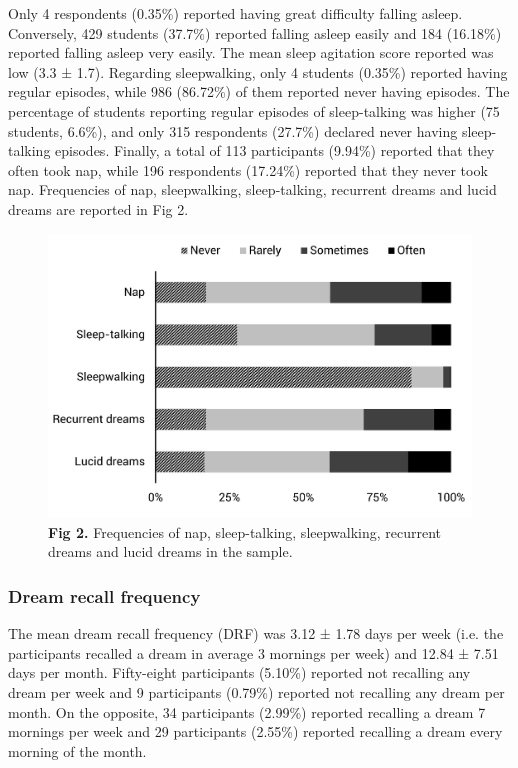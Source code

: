 Only 4 respondents (0.35\%) reported having great difficulty falling asleep. Conversely, 429 students (37.7\%) reported falling asleep easily and 184 (16.18\%) reported falling asleep very easily. The mean sleep agitation score reported was low (3.3 ± 1.7). Regarding sleepwalking, only 4 students (0.35\%) reported having regular episodes, while 986 (86.72\%) of them reported never having episodes. The percentage of students reporting regular episodes of sleep-talking was higher (75 students, 6.6\%), and only 315 respondents (27.7\%) declared never having sleep-talking episodes. Finally, a total of 113 participants (9.94\%) reported that they often took nap, while 196 respondents (17.24\%) reported that they never took nap. Frequencies of nap, sleepwalking, sleep-talking, recurrent dreams and lucid dreams are reported in Fig 2.

\begin{figure}[htb]
	\includegraphics[width=\textwidth]{Fig/Results/Survey/Fig2.png}
	\caption*{\textbf{Fig 2.} Frequencies of nap, sleep-talking, sleepwalking, recurrent dreams and lucid dreams in the sample.}
\end{figure}

\subsubsection*{Dream recall frequency}
The mean dream recall frequency (DRF) was 3.12 ± 1.78 days per week (i.e. the participants recalled a dream in average 3 mornings per week) and 12.84 ± 7.51 days per month. Fifty-eight participants (5.10\%) reported not recalling any dream per week and 9 participants (0.79\%) reported not recalling any dream per month. On the opposite, 34 participants (2.99\%) reported recalling a dream 7 mornings per week and 29 participants (2.55\%) reported recalling a dream every morning of the month.

